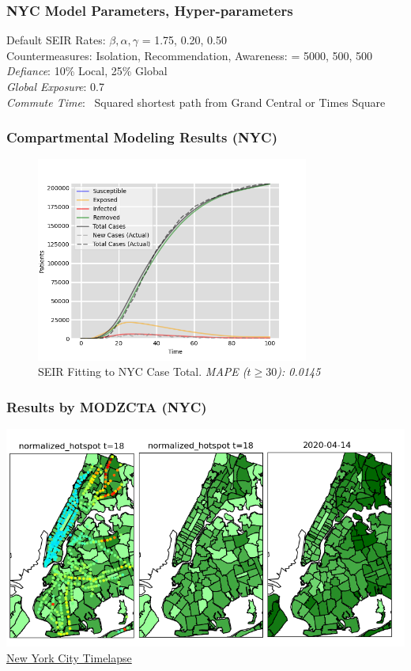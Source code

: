 \documentclass{beamer}
\begin{document}
\begin{frame}
\frametitle{NYC Model Parameters, Hyper-parameters}
Default SEIR Rates: $\beta,\alpha,\gamma$ = 1.75, 0.20, 0.50 \\
Countermeasures: Isolation, Recommendation, Awareness: = 5000, 500, 500 \\
\textit{Defiance}: 10\% Local, 25\% Global \\
\textit{Global Exposure}: 0.7 \\
\textit{Commute Time}: ~Squared shortest path from Grand Central or Times Square \\
\end{frame}
\begin{frame}
\frametitle{Compartmental Modeling Results (NYC)}
\begin{figure}
\includegraphics[width=0.8\textwidth]{Scratch_Visuals/SEIR_Curve_NYC_3.png}
\caption{SEIR Fitting to NYC Case Total. \textit{MAPE ($t \geq 30$): 0.0145}}
\end{figure}
\end{frame}
\begin{frame}
\frametitle{Results by MODZCTA (NYC)}
\includegraphics[width=1.0\textwidth]{Scratch_Visuals/NYC_Geo_Fitting.png}
\href{https://github.com/cheung-ho-lum/NS_Epidemics_ABM_Approach/blob/master/Repository/Visualizations/infection_timelapse_NYC_3.gif}{New York City Timelapse}
\end{frame}
\end{document}
